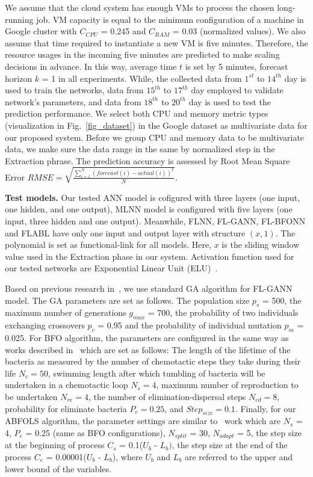\documentclass[runningheads]{llncs}
\begin{document}
We assume that the cloud system has enough VMs to process the chosen long-running job. VM capacity is equal to the minimum configuration of a machine in Google cluster with $C_{CPU}$ = 0.245 and $C_{RAM}$ = 0.03 (normalized values). We also assume that time required to instantiate a new VM is five minutes. Therefore, the resource usages in the incoming five minutes are predicted to make scaling decisions in advance. In this way, average time $t$ is set by 5 minutes, forecast horizon $k$ = 1 in all experiments. While, the collected data from $1^{st}$ to $14^{th}$ day is used to train the networks, data from $15^{th}$ to $17^{th}$ day employed to validate network's parameters, and data from $18^{th}$ to $20^{th}$ day is used to test the prediction performance. We select both CPU and memory metric types (visualization in Fig.~\ref{fig_dataset}) in the Google dataset as multivariate data for our proposed system. Before we group CPU and memory data to be multivariate data, we make sure the data range in the same by normalized step in the Extraction phrase. The prediction accuracy is assessed by Root Mean Square Error $RMSE = \sqrt{  \frac{\sum_{i=1}^N( forecast(i) - actual(i) )^2}{N} }$.

\textbf{Test models.} Our tested ANN model is cofigured with three layers (one input, one hidden, and one output), MLNN model is configured with five layers (one input, three hidden and one output). Meanwhile, FLNN, FL-GANN, FL-BFONN and FLABL have only one input and output layer with structure $(x, 1)$. The polynomial is set as functional-link for all models. Here, $x$ is the sliding window value used in the Extraction phase in our system. Activation function used for our tested networks are Exponential Linear Unit (ELU)~\cite{ref_clevert}.

Based on previous research in~\cite{ref_thieu}, we use standard GA algorithm for FL-GANN model. The GA parameters are set as follows. The population size $p_s$ = 500, the maximum number of generations $g_{max}$ = 700, the probability of two individuals exchanging crossovers $p_c$ = 0.95 and the probability of individual mutation $p_m$ = 0.025. For BFO algorithm, the parameters are configured in the same way as works described in~\cite{ref_passino} which are set as follows: The length of the lifetime of the bacteria as measured by the number of chemotactic steps they take during their life $N_c = 50$, swimming length after which tumbling of bacteria will be undertaken in a chemotactic loop $N_s = 4$, maximum number of reproduction to be undertaken $N_{re} = 4$, the number of elimination-dispersal steps $N_{ed} = 8$, probability for eliminate bacteria $P_e = 0.25$, and $Step_{size} = 0.1$. Finally, for our ABFOLS algorithm, the parameter settings are similar to~\cite{ref_yan} work which are $N_s$ = 4, $P_e$ = 0.25 (same as BFO configurations), $N_{split}$ = 30, $N_{adapt}$ = 5, the step size at the beginning of process $C_s$ = 0.1($U_b$ - $L_b)$, the step size at the end of the process $C_e$ = 0.00001($U_b$ - $L_b$), where $U_b$ and $L_b$ are referred to the upper and lower bound of the variables. 
\end{document}
